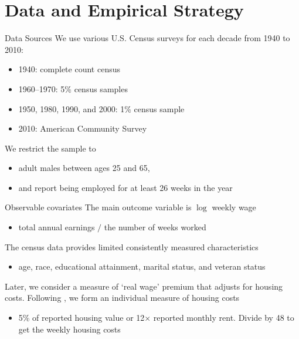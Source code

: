\documentclass[aspectratio=169,t]{beamer}
\begin{document}

\section{Data and Empirical Strategy}

\begin{frame}{Data Sources}
  We use various U.S. Census surveys for each decade from 1940 to 2010:
  \begin{itemize}
    \item 1940: complete count census
    
    \item 1960--1970: 5\% census samples
    
    \item 1950, 1980, 1990, and 2000: 1\% census sample
    
    \item 2010: American Community Survey
  \end{itemize}
  
  \bigskip
  We restrict the sample to
  \begin{itemize}
    \item adult males between ages 25 and 65,
    \item and report being employed for at least 26 weeks in the year
  \end{itemize} 
\end{frame}

\begin{frame}{Observable covariates}
  The main outcome variable is $\log$ weekly wage
  \begin{itemize}
    \item total annual earnings $/$ the number of weeks worked
  \end{itemize}

  \bigskip
  The census data provides limited consistently measured characteristics
  \begin{itemize}
    \item age, race, educational attainment, marital status, and veteran status
  \end{itemize}

  \pause
  \bigskip
  Later, we consider a measure of `real wage' premium that adjusts for housing costs. Following \citet{ganong2017has}, we form an individual measure of housing costs 
  \begin{itemize}
    \item 5\% of reported housing value or 12$\times$ reported monthly rent.  Divide by 48 to get the weekly housing costs
  \end{itemize}
\end{frame}
\end{document}
